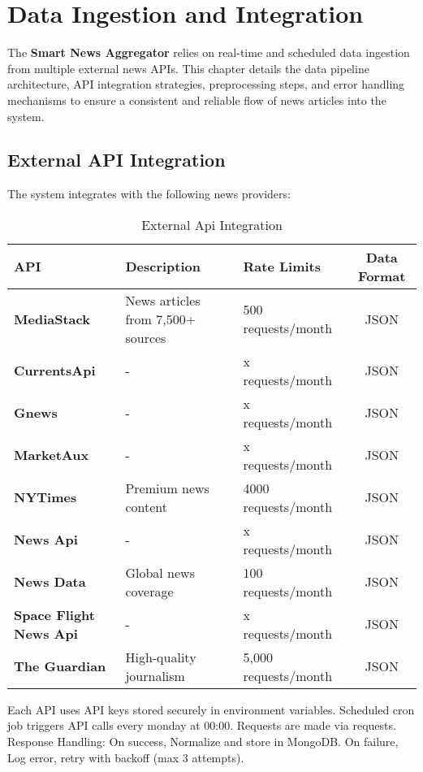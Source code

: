 
\chapter{Data Ingestion and Integration}\label{ch:data-ingestion-and-integration}


The \textbf{Smart News Aggregator} relies on real-time and scheduled data ingestion from multiple external news APIs.
This chapter details the data pipeline architecture, API integration strategies, preprocessing steps,
and error handling mechanisms to ensure a consistent and reliable flow of news articles into the system.


\section{External API Integration}\label{sec:external-api-integration}


The system integrates with the following news providers:

\begin{table}[h!]
  \centering
  \begin{tabular}{|l|l|l|c|}
    \hline
    API & Description & Rate Limits & Data Format \\
    \hline
    \textbf{MediaStack} & News articles from 7,500+ sources & 500 requests/month & JSON \\
    \textbf{CurrentsApi} & - & x requests/month & JSON \\
    \textbf{Gnews} & - & x requests/month & JSON \\
    \textbf{MarketAux} & - & x requests/month & JSON \\
    \textbf{NYTimes} & Premium news content & 4000 requests/month & JSON \\
    \textbf{News Api} & - & x requests/month & JSON \\
    \textbf{News Data} & Global news coverage & 100 requests/month & JSON \\
    \textbf{Space Flight News Api} & - & x requests/month & JSON \\
    \textbf{The Guardian} & High-quality journalism & 5,000 requests/month & JSON \\
    \hline
  \end{tabular}
  \caption{External Api Integration}
  \label{tab:external-api-integration}
\end{table}


Each API uses API keys stored securely in environment variables.
Scheduled cron job triggers API calls every monday at 00:00.
Requests are made via requests.
Response Handling: On success, Normalize and store in MongoDB. On failure, Log error, retry with backoff (max 3 attempts).


